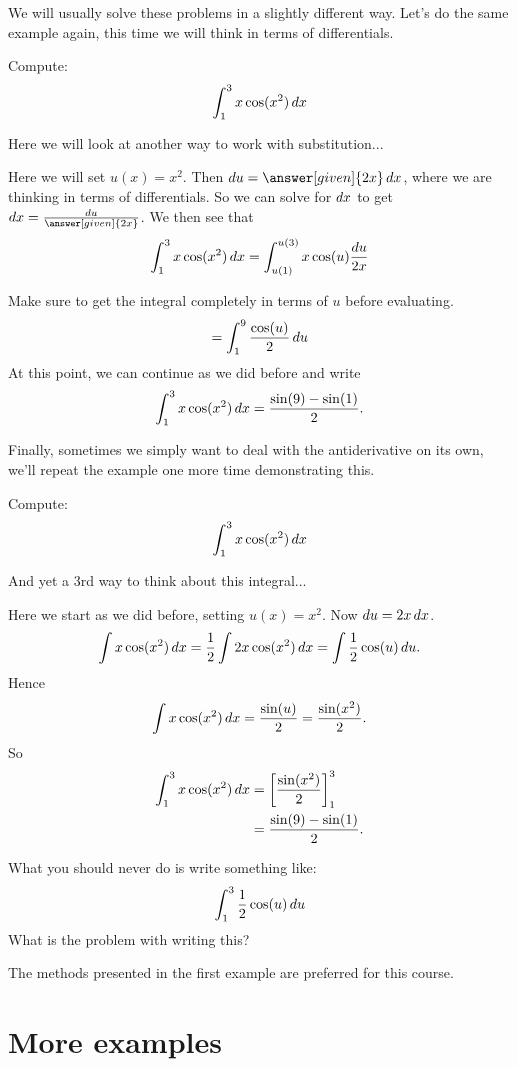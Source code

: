 \documentclass{ximera}
\begin{document}
We will usually solve these problems in a slightly different
way. Let's do the same example again, this time we will think in terms
of differentials.

\begin{example}\label{main example}
Compute:
\[
\int_1^3 x\cos(x^2)\mathop{}\!d x
\]
\begin{explanation}
Here we will look at another way to work with substitution...

Here we will set $u(x) = x^2$. Then $\d u = \answer[given]{2x} \d x$,
where we are thinking in terms of differentials. So we can solve for
$\mathop{}\!d x$ to get $\d x = \frac{\d u}{\answer[given]{2x}}$.  We then see
that
\[
  \int_1^3 x \cos(x^2) \mathop{}\!d x = \int_{u(1)}^{u(3)} x \cos(u) \frac{\mathop{}\!d u}{2x}
\]

Make sure to get the integral completely in terms of $u$ before evaluating.
\[
  = \int_{1}^{9} \frac{\cos(u)}{2}\mathop{}\!d u
\]
At this point, we can continue as we did before and write
\[
\int_1^3 x\cos(x^2)\mathop{}\!d x= \frac{\sin(9) -\sin(1)}{2}.
\]
\end{explanation}
\end{example}

Finally, sometimes we simply want to deal with the antiderivative on
its own, we'll repeat the example one more time demonstrating this.

\begin{example}
Compute:
\[
\int_1^3 x\cos(x^2)\mathop{}\!d x
\]
\begin{explanation}
And yet a 3rd way to think about this integral...

Here we start as we did before, setting $u(x)=x^2$. Now $\mathop{}\!d u =  2x \mathop{}\!d x$.
\[
\int x \cos(x^2) \mathop{}\!d x = \frac{1}{2}\int 2x\cos(x^2) \mathop{}\!d x = \int \frac{1}{2} \cos(u)\mathop{}\!d u .
\]
Hence 
\[
\int x\cos(x^2)\mathop{}\!d x = \frac{\sin(u)}{2} = \frac{\sin(x^2)}{2}.
\]
So
\begin{align*}
\int_1^3 x\cos(x^2)\mathop{}\!d x &=\bigg[ \frac{\sin(x^2)}{2} \bigg]_1^3\\
&= \frac{\sin(9) -\sin(1)}{2}.
\end{align*}

What you should never do is write something like:
\[
\int_1^3 \frac{1}{2}\cos(u) \mathop{}\!d u
\]
What is the problem with writing this? 

The methods presented in the first example are preferred for this course.

\end{explanation}
\end{example}

\section{More examples}
\end{document}
